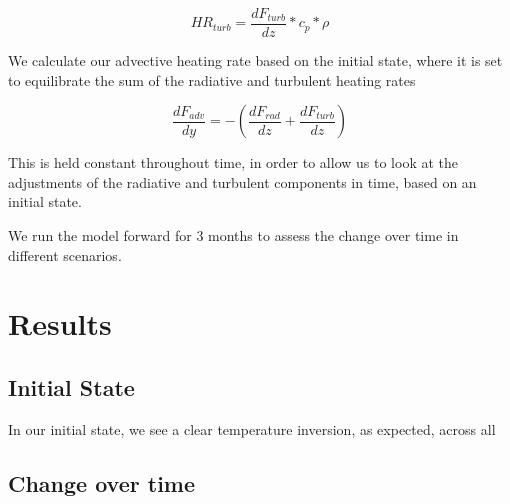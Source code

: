 \documentclass[12]{article}
\begin{document}
\begin{equation}
    HR_{turb} = \frac{dF_{turb}}{dz} * c_p * \rho
\end{equation}

We calculate our advective heating rate based on the initial state, where it is set to equilibrate the sum of the radiative and turbulent heating rates

\begin{equation}
    \frac{dF_{adv}}{dy} = -(\frac{dF_{rad}}{dz} + \frac{dF_{turb}}{dz})
\end{equation}

This is held constant throughout time, in order to allow us to look at the adjustments of the radiative and turbulent components in time, based on an initial state. 

We run the model forward for 3 months to assess the change over time in different  scenarios.

\section{Results}
\subsection{Initial State}
In our initial state, we see a clear temperature inversion, as expected, across all 

\subsection{Change over time}


\pagebreak


\end{document}
